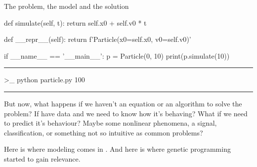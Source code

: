 \begin{frame}{The problem, the model and the solution}
\begin{beamerlst}[language=python]
  def simulate(self, t):
    return self.x0 + self.v0 * t

  def __repr__(self):
    return f'Particle(x0={self.x0}, v0={self.v0})'
     
if __name__ == '__main__':
  p = Particle(0, 10)
  print(p.simulate(10))
  \end{beamerlst}
  \begin{center} \rule{0.9\linewidth}{0.4pt} \end{center}

  \vfill

  \begin{beamerlst}
  >_ python particle.py
  100
  \end{beamerlst}

  \vfill

  \begin{center} \rule{0.9\linewidth}{0.4pt} \end{center}
  \newpage

  \begin{blur}
    But now, what happens if we haven't an equation or an algorithm to solve
    the problem? If have data and we need to know how it's behaving? What if
    we need to predict it's behaviour? Maybe some nonlinear phenomena,
    a signal, classification, or something not so intuitive as common
    problems? 
  \end{blur}
  
  \begin{blur}
    Here is where modeling comes in \cite{Eiben2015}. And here is where genetic programming
    started to gain relevance.
  \end{blur}
  

\end{frame}

